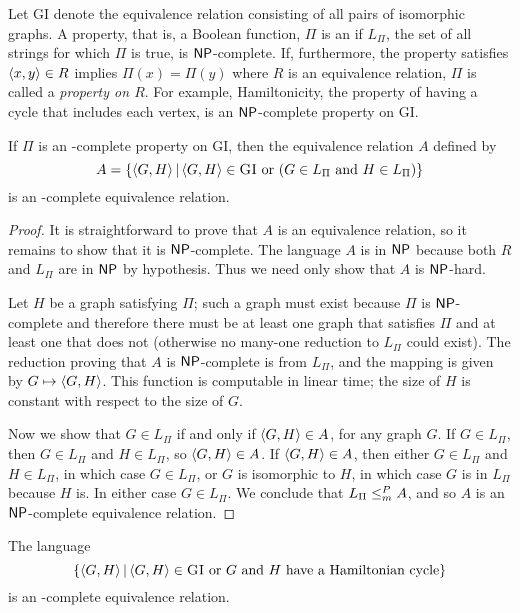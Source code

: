 Let \textsc{GI} denote the equivalence relation consisting of all pairs of isomorphic graphs.
A property, that is, a Boolean function, $\Pi$ is an  if $L_\Pi$, the set of all strings for which $\Pi$ is true, is ${\mathsf{NP}}$-complete.
If, furthermore, the property satisfies $\left\langle x,y\right\rangle \in R$ implies $\Pi(x) = \Pi(y)$ where $R$ is an equivalence relation, $\Pi$ is called a \emph{property on $R$}.
For example, Hamiltonicity, the property of having a cycle that includes each vertex, is an ${\mathsf{NP}}$-complete property on \textsc{GI}.

\begin{theorem}\label{thm:npceqrel}
  If $\Pi$ is an \NP-complete property on \textsc{GI}, then the equivalence relation $A$ defined by
  \begin{equation*}
    A = \left\{ \left\langle G,H\right\rangle \, \middle| \, \left\langle G,H\right\rangle \in \textsc{GI} \text{ or } (G \in L_\Pi \text{ and } H \in L_\Pi) \right\}
  \end{equation*}
  is an \NP-complete equivalence relation.
\end{theorem}
\begin{proof}
  It is straightforward to prove that $A$ is an equivalence relation, so it remains to show that it is ${\mathsf{NP}}$-complete.
  The language $A$ is in ${\mathsf{NP}}$ because both $R$ and $L_\Pi$ are in ${\mathsf{NP}}$ by hypothesis.
  Thus we need only show that $A$ is ${\mathsf{NP}}$-hard.

  Let $H$ be a graph satisfying $\Pi$; such a graph must exist because $\Pi$ is ${\mathsf{NP}}$-complete and therefore there must be at least one graph that satisfies $\Pi$ and at least one that does not (otherwise no many-one reduction to $L_\Pi$ could exist).
  The reduction proving that $A$ is ${\mathsf{NP}}$-complete is from $L_\Pi$, and the mapping is given by $G \mapsto \left\langle G,H\right\rangle$.
  This function is computable in linear time; the size of $H$ is constant with respect to the size of $G$.

  Now we show that $G \in L_\Pi$ if and only if $\left\langle G,H\right\rangle \in A$, for any graph $G$.
  If $G \in L_\Pi$, then $G \in L_\Pi$ and $H \in L_\Pi$, so $\left\langle G,H\right\rangle \in A$.
  If $\left\langle G,H\right\rangle \in A$, then either $G \in L_\Pi$ and $H \in L_\Pi$, in which case $G \in L_\Pi$, or $G$ is isomorphic to $H$, in which case $G$ is in $L_\Pi$ because $H$ is.
  In either case $G \in L_\Pi$.
  We conclude that $L_\Pi \leq^{P}_{m} A$, and so $A$ is an ${\mathsf{NP}}$-complete equivalence relation.
\end{proof}

\begin{example}\label{ex:npceqrel}
  The language
  \begin{equation*}
    \left\{ \left\langle G,H\right\rangle \, \middle| \, \left\langle G,H\right\rangle \in \textsc{GI} \text{ or } G \text{ and } H \text{ have a Hamiltonian cycle}  \right\}
  \end{equation*}
  is an \NP-complete equivalence relation.
\end{example}

